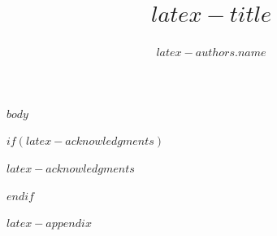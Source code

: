 \documentclass[sigconf]{acmart}
\title{$latex-title$}
\author{$latex-authors.name$}
\affiliation{%
  \institution{$latex-authors.institute$}
  \city{$latex-authors.city$}
  \country{$latex-authors.country$}
}
\begin{document}
\maketitle

$body$

$if(latex-acknowledgments)$
\begin{acks}
$latex-acknowledgments$
\end{acks}
$endif$




$latex-appendix$
\end{document}
